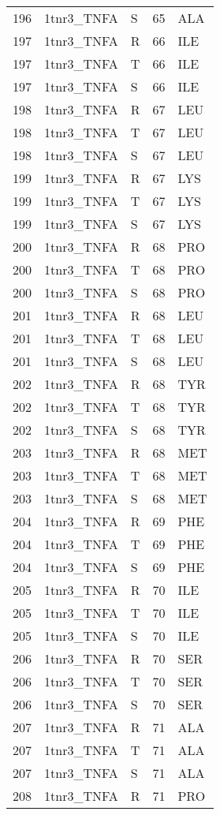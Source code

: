 \begin{longtable}[l]{l|l|l|l|l}
	196 & 1tnr3_TNFA & S & 65 & ALA \\
	197 & 1tnr3_TNFA & R & 66 & ILE \\
	197 & 1tnr3_TNFA & T & 66 & ILE \\
	197 & 1tnr3_TNFA & S & 66 & ILE \\
	198 & 1tnr3_TNFA & R & 67 & LEU \\
	198 & 1tnr3_TNFA & T & 67 & LEU \\
	198 & 1tnr3_TNFA & S & 67 & LEU \\
	199 & 1tnr3_TNFA & R & 67 & LYS \\
	199 & 1tnr3_TNFA & T & 67 & LYS \\
	199 & 1tnr3_TNFA & S & 67 & LYS \\
	200 & 1tnr3_TNFA & R & 68 & PRO \\
	200 & 1tnr3_TNFA & T & 68 & PRO \\
	200 & 1tnr3_TNFA & S & 68 & PRO \\
	201 & 1tnr3_TNFA & R & 68 & LEU \\
	201 & 1tnr3_TNFA & T & 68 & LEU \\
	201 & 1tnr3_TNFA & S & 68 & LEU \\
	202 & 1tnr3_TNFA & R & 68 & TYR \\
	202 & 1tnr3_TNFA & T & 68 & TYR \\
	202 & 1tnr3_TNFA & S & 68 & TYR \\
	203 & 1tnr3_TNFA & R & 68 & MET \\
	203 & 1tnr3_TNFA & T & 68 & MET \\
	203 & 1tnr3_TNFA & S & 68 & MET \\
	204 & 1tnr3_TNFA & R & 69 & PHE \\
	204 & 1tnr3_TNFA & T & 69 & PHE \\
	204 & 1tnr3_TNFA & S & 69 & PHE \\
	205 & 1tnr3_TNFA & R & 70 & ILE \\
	205 & 1tnr3_TNFA & T & 70 & ILE \\
	205 & 1tnr3_TNFA & S & 70 & ILE \\
	206 & 1tnr3_TNFA & R & 70 & SER \\
	206 & 1tnr3_TNFA & T & 70 & SER \\
	206 & 1tnr3_TNFA & S & 70 & SER \\
	207 & 1tnr3_TNFA & R & 71 & ALA \\
	207 & 1tnr3_TNFA & T & 71 & ALA \\
	207 & 1tnr3_TNFA & S & 71 & ALA \\
	208 & 1tnr3_TNFA & R & 71 & PRO \\

\end{longtable}
